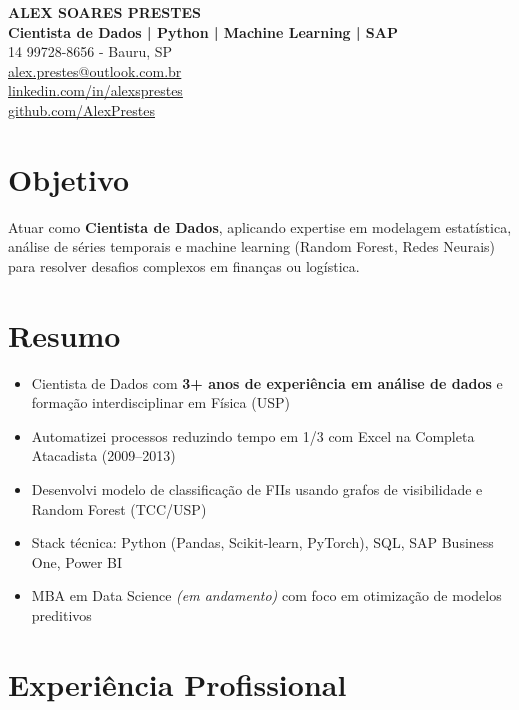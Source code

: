 \documentclass[11pt, a4paper]{article}
\begin{document}
\begin{center}
    {\Huge \textbf{ALEX SOARES PRESTES}} \\[0.2cm]
    {\large \textbf{Cientista de Dados | Python | Machine Learning | SAP}} \\[0.2cm]
    {\small 
   14 99728-8656   -   Bauru, SP \\
    \href{mailto:alex.prestes@outlook.com.br}{alex.prestes@outlook.com.br} \\
    \href{https://linkedin.com/in/alexsprestes}{linkedin.com/in/alexsprestes} \\
    \href{https://github.com/AlexPrestes}{github.com/AlexPrestes}
    }
\end{center}

\section*{Objetivo}
Atuar como \textbf{Cientista de Dados}, aplicando expertise em modelagem estatística, análise de séries temporais e machine learning (Random Forest, Redes Neurais) para resolver desafios complexos em finanças ou logística.

\section*{Resumo}
\begin{itemize}
    \item Cientista de Dados com \textbf{3+ anos de experiência em análise de dados} e formação interdisciplinar em Física (USP)
    \item Automatizei processos reduzindo tempo em 1/3 com Excel na Completa Atacadista (2009–2013)
    \item Desenvolvi modelo de classificação de FIIs usando grafos de visibilidade e Random Forest (TCC/USP)
    \item Stack técnica: Python (Pandas, Scikit-learn, PyTorch), SQL, SAP Business One, Power BI
    \item MBA em Data Science \emph{(em andamento)} com foco em otimização de modelos preditivos
\end{itemize}

\section*{Experiência Profissional}
\end{document}
